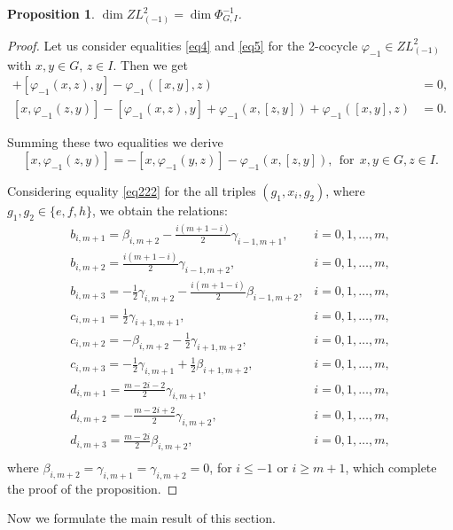 \documentclass[12pt,reqno]{amsart}
\newtheorem{prop}[thm]{Proposition}
\numberwithin{equation}{section}
\begin{document}
\begin{prop} $\dim ZL^2_{(-1)}=\dim \Phi_{G,I}^{-1}$.
\end{prop}
\begin{proof} Let us consider equalities \eqref{eq4} and \eqref{eq5} for the 2-cocycle $\varphi_{-1}\in ZL^2_{(-1)}$ with
$x, y \in G, \, z\in I$. Then we get
\begin{align*}
[x,\varphi_{-1}(y,z)] + [\varphi_{-1}(x,z), y] - \varphi_{-1}([x,y],z)&=0,\\
[x,\varphi_{-1}(z,y)] - [\varphi_{-1}(x,z), y]  + \varphi_{-1}(x, [z,y]) + \varphi_{-1}([x,y],z)&=0.
\end{align*}

Summing these two equalities we derive
\begin{equation} \label{eq222}
[x,\varphi_{-1}(z,y)]=-[x, \varphi_{-1}(y,z)]- \varphi_{-1}(x,
[z,y]), \ \ \text{for} \ \ x, y\in G, z\in I.
\end{equation}

Considering equality \eqref{eq222} for the all triples $(g_1, x_i, g_2)$, where $g_1,g_2\in \{e, f, h\}$,
we obtain the relations:
\[
\begin{array}{ll}
b_{i,m+1}=\beta_{i, m+2}-\frac{i(m+1-i)}{2}\gamma_{i-1, m+1}, &   i=0,1,\dots,m, \\[1mm]
b_{i,m+2}=\frac{i(m+1-i)}{2}\gamma_{i-1, m+2}, &   i=0,1,\dots,m, \\[1mm]
b_{i,m+3}=-\frac{1}{2}\gamma_{i, m+2}-\frac{i(m+1-i)}{2}\beta_{i-1, m+2}, &   i=0,1,\dots,m, \\[1mm]
c_{i,m+1}=\frac{1}{2}\gamma_{i+1, m+1}, &   i=0,1,\dots,m, \\[1mm]
c_{i,m+2}=-\beta_{i, m+2}-\frac{1}{2}\gamma_{i+1, m+2}, &   i=0,1,\dots,m, \\[1mm]
c_{i,m+3}=-\frac{1}{2}\gamma_{i, m+1}+\frac{1}{2}\beta_{i+1, m+2}, &   i=0,1,\dots,m, \\[1mm]
d_{i,m+1}=\frac{m-2i-2}{2}\gamma_{i, m+1}, &   i=0,1,\dots,m, \\[1mm]
d_{i,m+2}=-\frac{m-2i+2}{2}\gamma_{i, m+2}, &   i=0,1,\dots,m, \\[1mm]
d_{i,m+3}=\frac{m-2i}{2}\beta_{i, m+2}, &   i=0,1,\dots,m, \\[1mm]
\end{array}\]
where $\beta_{i,m+2}=\gamma_{i,m+1}=\gamma_{i,m+2}=0$, for $i\leq
-1$ or $i\geq m+1$, which complete the proof of the  proposition.
\end{proof}

Now we formulate the main result of this section.
\end{document}
